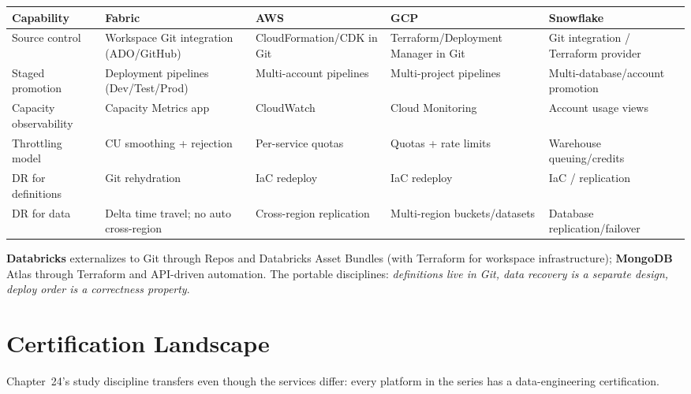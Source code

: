 \begin{center}
\footnotesize
\begin{tabular}{@{}p{2.8cm}p{3.2cm}p{3.2cm}p{3.2cm}p{3.2cm}@{}}
\toprule
\textbf{Capability} & \textbf{Fabric} & \textbf{AWS} & \textbf{GCP} & \textbf{Snowflake} \\
\midrule
Source control & Workspace Git integration (ADO/GitHub) & CloudFormation/CDK in Git & Terraform/Deployment Manager in Git & Git integration / Terraform provider \\
Staged promotion & Deployment pipelines (Dev/Test/Prod) & Multi-account pipelines & Multi-project pipelines & Multi-database/account promotion \\
Capacity observability & Capacity Metrics app & CloudWatch & Cloud Monitoring & Account usage views \\
Throttling model & CU smoothing + rejection & Per-service quotas & Quotas + rate limits & Warehouse queuing/credits \\
DR for definitions & Git rehydration & IaC redeploy & IaC redeploy & IaC / replication \\
DR for data & Delta time travel; no auto cross-region & Cross-region replication & Multi-region buckets/datasets & Database replication/failover \\
\bottomrule
\end{tabular}
\end{center}

\noindent \textbf{Databricks} externalizes to Git through Repos and Databricks Asset Bundles
(with Terraform for workspace infrastructure); \textbf{MongoDB} Atlas through Terraform and
API-driven automation. The portable disciplines: \emph{definitions live in Git, data recovery
is a separate design, deploy order is a correctness property}.

\section{Certification Landscape}
%
Chapter~24's study discipline transfers even though the services differ: every platform in the
series has a data-engineering certification.

